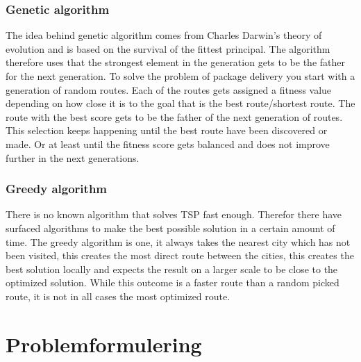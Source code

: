 \documentclass[12pt]{report}
\begin{document}
\subsection{Genetic algorithm}
The idea behind genetic algorithm comes from Charles Darwin's theory of evolution and is based on the survival of the fittest principal. The algorithm therefore uses that the strongest element in the generation gets to be the father for the next generation. To solve the problem of package delivery you start with a generation of random routes. Each of the routes gets assigned a fitness value depending on how close it is to the goal that is the best route/shortest route. The route with the best score gets to be the father of the next generation of routes. This selection keeps happening until the best route have been discovered or made. Or at least until the fitness score gets balanced and does not improve further in the next generations.

\subsection{Greedy algorithm}
There is no known algorithm that solves TSP fast enough. Therefor there have surfaced algorithms to make the best possible solution in a certain amount of time. The greedy algorithm is one, it always takes the nearest city which has not been visited, this creates the most direct route between the cities, this creates the best solution locally and expects the result on a larger scale to be close to the optimized solution. While this outcome is a faster route than a random picked route, it is not in all cases the most optimized route. 



\chapter{Problemformulering}
\end{document}
